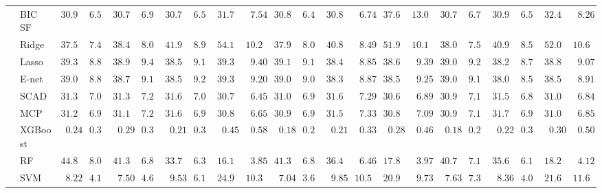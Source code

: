 \begin{tabular}{ll|ll|llllll|llllll|llllll}
 & BIC SF  & $30.94$ & $6.56$ & $30.76$ & $6.90$ & $30.76$ & $6.55$ & $31.79$ & $\phantom{0}7.54$ & $30.87$ & $6.45$ & $30.87$ & $\phantom{0}6.74$ & $37.60$ & $13.09$ & $30.74$ & $6.72$ & $30.93$ & $6.55$ & $32.43$ & $\phantom{0}8.26$ \\
 & Ridge  & $37.50$ & $7.43$ & $38.48$ & $8.08$ & $41.94$ & $8.98$ & $54.12$ & $10.20$ & $37.97$ & $8.08$ & $40.86$ & $\phantom{0}8.49$ & $51.97$ & $10.11$ & $38.05$ & $7.59$ & $40.95$ & $8.59$ & $52.09$ & $10.63$ \\
 & Lasso  & $39.32$ & $8.88$ & $38.90$ & $9.42$ & $38.57$ & $9.18$ & $39.32$ & $\phantom{0}9.40$ & $39.19$ & $9.11$ & $38.42$ & $\phantom{0}8.85$ & $38.62$ & $\phantom{0}9.39$ & $39.08$ & $9.20$ & $38.20$ & $8.71$ & $38.81$ & $\phantom{0}9.07$ \\
 & E-net  & $39.02$ & $8.89$ & $38.73$ & $9.18$ & $38.50$ & $9.24$ & $39.37$ & $\phantom{0}9.20$ & $39.05$ & $9.07$ & $38.32$ & $\phantom{0}8.87$ & $38.54$ & $\phantom{0}9.25$ & $39.04$ & $9.19$ & $38.01$ & $8.52$ & $38.59$ & $\phantom{0}8.91$ \\
 & SCAD  & $31.35$ & $7.08$ & $31.35$ & $7.23$ & $31.66$ & $7.07$ & $30.71$ & $\phantom{0}6.45$ & $31.06$ & $6.90$ & $31.60$ & $\phantom{0}7.29$ & $30.66$ & $\phantom{0}6.89$ & $30.90$ & $7.18$ & $31.59$ & $6.83$ & $31.05$ & $\phantom{0}6.84$ \\
 & MCP  & $31.25$ & $6.98$ & $31.19$ & $7.29$ & $31.63$ & $6.96$ & $30.86$ & $\phantom{0}6.65$ & $30.94$ & $6.94$ & $31.56$ & $\phantom{0}7.33$ & $30.80$ & $\phantom{0}7.09$ & $30.93$ & $7.12$ & $31.70$ & $6.93$ & $31.05$ & $\phantom{0}6.85$ \\
 & XGBoost  & $\phantom{0}0.24$ & $0.32$ & $\phantom{0}0.29$ & $0.30$ & $\phantom{0}0.21$ & $0.31$ & $\phantom{0}0.45$ & $\phantom{0}0.58$ & $\phantom{0}0.18$ & $0.25$ & $\phantom{0}0.21$ & $\phantom{0}0.33$ & $\phantom{0}0.28$ & $\phantom{0}0.46$ & $\phantom{0}0.18$ & $0.27$ & $\phantom{0}0.22$ & $0.31$ & $\phantom{0}0.30$ & $\phantom{0}0.50$ \\
 & RF  & $44.87$ & $8.00$ & $41.30$ & $6.87$ & $33.76$ & $6.37$ & $16.17$ & $\phantom{0}3.85$ & $41.34$ & $6.80$ & $36.47$ & $\phantom{0}6.46$ & $17.89$ & $\phantom{0}3.97$ & $40.79$ & $7.13$ & $35.60$ & $6.13$ & $18.20$ & $\phantom{0}4.12$ \\
 & SVM  & $\phantom{0}8.22$ & $4.13$ & $\phantom{0}7.50$ & $4.68$ & $\phantom{0}9.53$ & $6.14$ & $24.99$ & $10.31$ & $\phantom{0}7.04$ & $3.64$ & $\phantom{0}9.85$ & $10.59$ & $20.90$ & $\phantom{0}9.73$ & $\phantom{0}7.63$ & $7.31$ & $\phantom{0}8.36$ & $4.04$ & $21.67$ & $11.60$ \\
\hline 
\end{tabular}

